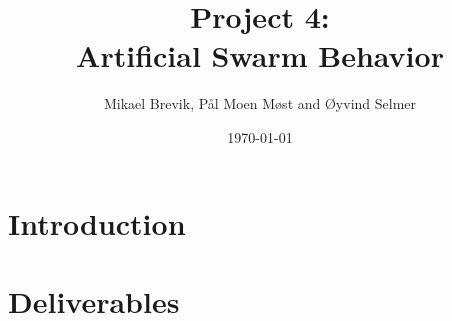 \documentclass[a4paper, 11pt]{report}
\title{Project 4: \\ Artificial Swarm Behavior}
\author{Mikael Brevik, Pål Moen Møst and Øyvind Selmer}
\date{\today}
\begin{document}
\maketitle
\tableofcontents


\chapter{Introduction}


\chapter{Deliverables}	

\newpage

\newpage

\newpage


\listoffigures



\end{document}
